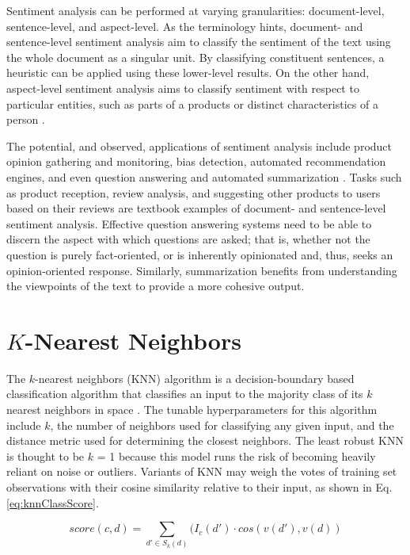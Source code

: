 Sentiment analysis can be performed at varying granularities: document-level, sentence-level, and aspect-level.  As the terminology hints, document- and sentence-level sentiment analysis aim to classify the sentiment of the text using the whole document as a singular unit.  By classifying constituent sentences, a heuristic can be applied using these lower-level results.  On the other hand, aspect-level sentiment analysis aims to classify sentiment with respect to particular entities, such as parts of a products or distinct characteristics of a person \cite{sentimentApp}.

The potential, and observed, applications of sentiment analysis include product opinion gathering and monitoring, bias detection, automated recommendation engines, and even question answering and automated summarization \cite{sentimentAnalysis}.  Tasks such as product reception, review analysis, and suggesting other products to users based on their reviews are textbook examples of document- and sentence-level sentiment analysis.  Effective question answering systems need to be able to discern the aspect with which questions are asked; that is, whether not the question is purely fact-oriented, or is inherently opinionated and, thus, seeks an opinion-oriented response.  Similarly, summarization benefits from understanding the viewpoints of the text to provide a more cohesive output.


\section{$K$-Nearest Neighbors} \label{knnSection}

The $k$-nearest neighbors (KNN) algorithm is a decision-boundary based classification algorithm that classifies an input to the majority class of its $k$ nearest neighbors in space \cite{knnIR}.  The tunable hyperparameters for this algorithm include $k$, the number of neighbors used for classifying any given input, and the distance metric used for determining the closest neighbors.  The least robust KNN is thought to be $k$ = 1 because this model runs the risk of becoming heavily reliant on noise or outliers.  Variants of KNN may weigh the votes of training set observations with their cosine similarity relative to their input, as shown in Eq. \ref{eq:knnClassScore}.

\begin{equation}
\label{eq:knnClassScore}
score(c, d) = \sum_{d' \in S_{k}(d)} (I_{c}(d') \cdot cos(v(d'), v(d))
\end{equation}


